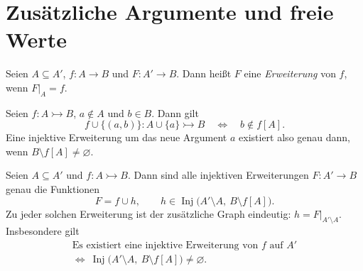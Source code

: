 \section{Zusätzliche Argumente und freie Werte}

\begin{definition}
Seien $A\subseteq A'$, $f\colon A\to B$ und $F\colon A'\to B$.
Dann heißt $F$ eine \emph{Erweiterung} von $f$, wenn $F|_A=f$.
\end{definition}

\begin{theorem}
\label{b06guide:thm:onepoint}
Seien $f\colon A\rightarrowtail B$, $a\notin A$ und $b\in B$.
Dann gilt
\[
 f\cup\{(a,b)\}\colon A\cup\{a\}\rightarrowtail B
 \quad\Longleftrightarrow\quad b\notin f[A].
\]
Eine injektive Erweiterung um das neue Argument $a$ existiert
also genau dann, wenn $B\setminus f[A]\ne\varnothing$.
\end{theorem}

\begin{theorem}
\label{b06guide:thm:extension}
Seien $A\subseteq A'$ und $f\colon A\rightarrowtail B$.
Dann sind alle injektiven Erweiterungen $F\colon A'\to B$
genau die Funktionen
\[
 F=f\cup h,\qquad
 h\in\operatorname{Inj}\bigl(A'\setminus A,\ B\setminus f[A]\bigr).
\]
Zu jeder solchen Erweiterung ist der zusätzliche Graph eindeutig:
$h=F|_{A'\setminus A}$.
Insbesondere gilt
\[
 \begin{gathered}
 \text{Es existiert eine injektive Erweiterung von }f\text{ auf }A'\\
 \Longleftrightarrow\
 \operatorname{Inj}\bigl(A'\setminus A,\ B\setminus f[A]\bigr)
        \ne\varnothing.
 \end{gathered}
\]
\end{theorem}
